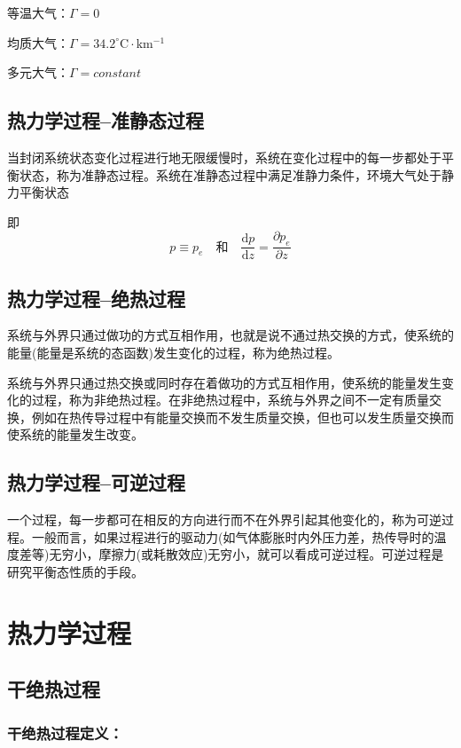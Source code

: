 \documentclass[UTF8,a4paper,11pt,oneside]{ctexbook}
\begin{document}
等温大气：\(\Gamma=0\)

均质大气：\(\Gamma=34.2^\circ\mathrm{C\cdot{}km^{-1}}\)

多元大气：\(\Gamma=constant\)

\section{热力学过程--准静态过程}

当封闭系统状态变化过程进行地无限缓慢时，系统在变化过程中的每一步都处于平衡状态，称为准静态过程。系统在准静态过程中满足准静力条件，环境大气处于静力平衡状态

即
\begin{equation}
p\equiv{}p_e\quad\text{和}\quad\dfrac{\mathrm{d}p}{\mathrm{d}z}=\dfrac{\partial{}p_e}{\partial{}z}
\end{equation}

\section{热力学过程--绝热过程}

系统与外界只通过做功的方式互相作用，也就是说不通过热交换的方式，使系统的能量(能量是系统的态函数)发生变化的过程，称为绝热过程。

系统与外界只通过热交换或同时存在着做功的方式互相作用，使系统的能量发生变化的过程，称为非绝热过程。在非绝热过程中，系统与外界之间不一定有质量交换，例如在热传导过程中有能量交换而不发生质量交换，但也可以发生质量交换而使系统的能量发生改变。

\section{热力学过程--可逆过程}
一个过程，每一步都可在相反的方向进行而不在外界引起其他变化的，称为可逆过程。一般而言，如果过程进行的驱动力(如气体膨胀时内外压力差，热传导时的温度差等)无穷小，摩擦力(或耗散效应)无穷小，就可以看成可逆过程。可逆过程是研究平衡态性质的手段。

\chapter{热力学过程}

\section{干绝热过程}

\subsection{干绝热过程定义：}
\end{document}
